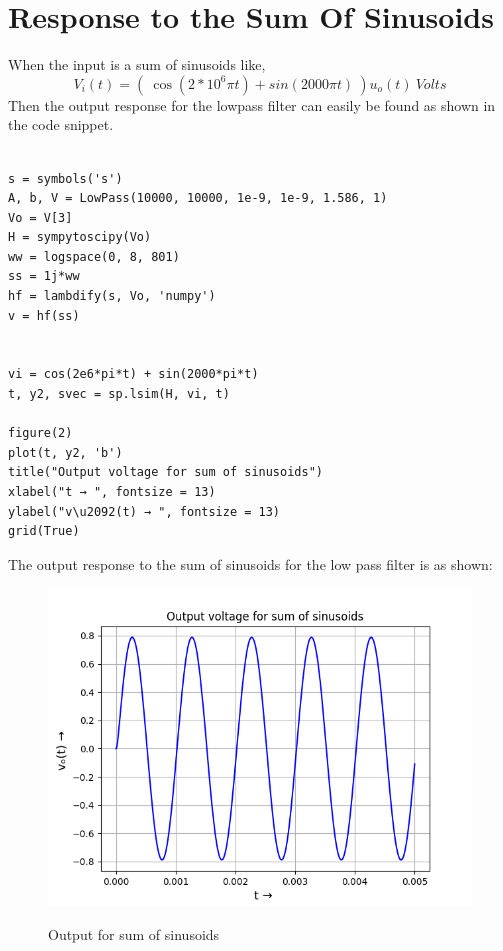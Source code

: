 \documentclass[11pt, a4paper]{article}
\begin{document}
\section*{Response to the Sum Of Sinusoids}   
    When the input is a sum of sinusoids like,
\begin{equation*}
  V_{i}(t) = ( \ \cos(2*10^{6}\pi t) + sin(2000\pi t)\ )u_{o}(t) \ Volts
  \end{equation*}
  Then the output response for the lowpass filter can easily be found as shown in the code snippet.
\begin{verbatim}
    
s = symbols('s')
A, b, V = LowPass(10000, 10000, 1e-9, 1e-9, 1.586, 1)
Vo = V[3]
H = sympytoscipy(Vo)
ww = logspace(0, 8, 801)
ss = 1j*ww
hf = lambdify(s, Vo, 'numpy')
v = hf(ss)


vi = cos(2e6*pi*t) + sin(2000*pi*t) 
t, y2, svec = sp.lsim(H, vi, t)

figure(2)
plot(t, y2, 'b')
title("Output voltage for sum of sinusoids")
xlabel("t → ", fontsize = 13)
ylabel("v\u2092(t) → ", fontsize = 13)
grid(True)
\end{verbatim}
The output response to the sum of sinusoids for the low pass filter is as shown:
\begin{figure}[!tbh]
   	\centering
   	\includegraphics[width=1.0\textwidth]{Ass7_Figure_2.png}
   	\label{fig:32}
   	\caption{Output for sum of sinusoids}
   \end{figure}
   \newpage
\end{document}
